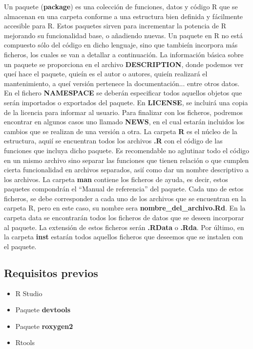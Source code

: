 Un paquete (\textbf{package}) es una colecci\'on de funciones, datos y c\'odigo R que se almacenan en una carpeta 
conforme a una estructura bien definida y f\'acilmente accesible para R.
Estos paquetes sirven para incrementar la potencia de R mejorando su funcionalidad base, o a\~nadiendo 
nuevas.
Un paquete en R no est\'a compuesto s\'olo del c\'odigo en dicho lenguaje, sino que tambie\'in incorpora m\'as ficheros, 
los cuales se van a detallar a continuaci\'on.
La informaci\'on b\'asica sobre un paquete se proporciona en el archivo \textbf{\textbf{DESCRIPTION}}, donde podemos ver que\'i hace 
el paquete, quie\'in es el autor o autores, quie\'in realizar\'a el mantenimiento, a que\'i versi\'on pertenece la 
documentaci\'on... entre otros datos.
En el fichero \textbf{NAMESPACE} se deber\'an especificar todos aquellos objetos que ser\'an importados o exportados del paquete.
En \textbf{LICENSE}, se incluir\'a una copia de la licencia para informar al usuario.
Para finalizar con los ficheros, podremos encontrar en algunos casos uno llamado \textbf{NEWS}, en el cual estar\'an 
incluidos los cambios que se realizan de una versi\'on a otra.
La carpeta \textbf{R} es el n\'ucleo de la estructura, aqui\'i se encuentran todos los archivos \textbf{\textbf{.R}} con el c\'odigo de las funciones que incluya dicho paquete.
Es recomendable no aglutinar todo el c\'odigo en un mismo archivo sino separar las funciones que tienen relaci\'on 
o que cumplen cierta funcionalidad en archivos separados, asi\'i como dar un nombre descriptivo a los archivos.
La carpeta \textbf{man} contiene los ficheros de ayuda, es decir, estos paquetes compondr\'an el “Manual de referencia” 
del paquete. Cada uno de estos ficheros, se debe corresponder a cada uno de los archivos que se encuentran 
en la carpeta R, pero en este caso, su nombre sera \textbf{nombre\_del\_archivo\textbf{.R}d}.
En la carpeta data se encontrar\'an todos los ficheros de datos que se deseen incorporar al paquete. La extensi\'on 
de estos ficheros ser\'an \textbf{\textbf{.R}Data} o \textbf{\textbf{.R}da}.
Por \'ultimo, en la carpeta \textbf{inst} estar\'an todos aquellos ficheros que deseemos que se instalen con el paquete.


\subsection{Requisitos previos}

\begin{itemize}
    \item R Studio
    \item Paquete \textbf{devtools}
    \item Paquete \textbf{\textbf{roxygen2}} 
    \item Rtools
\end{itemize}


